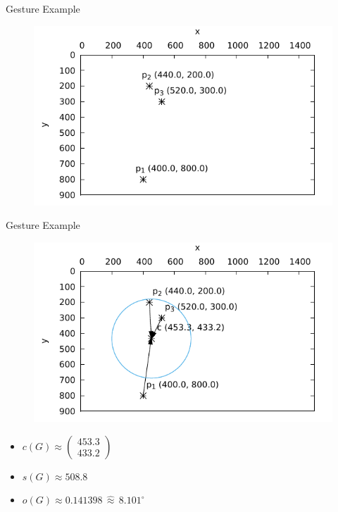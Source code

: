 \documentclass[t]{beamer}
\newcommand{\vectwo}[2]{
	\left(
	\begin{matrix}
		#1 \\
		#2 
	\end{matrix}
	\right)
}
\begin{document}
\begin{frame}{Gesture Example}
\begin{figure}
	\includegraphics[height=0.8\textheight]{assets/chpt_concepts/gestures/3pointers_blank.pdf}
\end{figure}
\end{frame}

\begin{frame}{Gesture Example}
\begin{minipage}{0.5\linewidth}
	\begin{figure}
		\includegraphics[width=\linewidth]{assets/chpt_concepts/gestures/3pointers_center.pdf}
	\end{figure}
\end{minipage}
\begin{minipage}{0.48\linewidth}
	\begin{itemize}
		\item $c(G) \approx \vectwo{453.3}{433.2}$
		\item $s(G) \approx 508.8$
		\item $o(G) \approx 0.141398 \, \widehat{\approx} \, 8.101 ^\circ$
	\end{itemize}
\end{minipage}
\end{frame}
\end{document}
